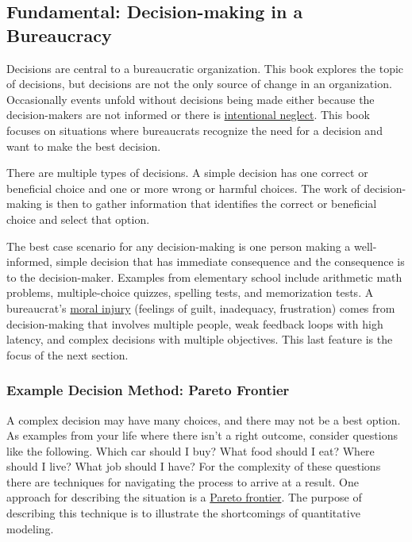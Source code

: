 \subsection*{Fundamental: Decision-making in a Bureaucracy\label{sec:decision-making}}

Decisions are central to a bureaucratic organization. This book explores the topic of decisions, but decisions are not the only source of change in an organization. Occasionally events unfold without decisions being made either because the decision-makers are not informed or there is  \href{https://en.wikipedia.org/wiki/Willful_blindness}{intentional neglect}. 
\iftoggle{WPinmargin}{\marginpar{$>$Wikipedia: Willful blindness}}{}
This book focuses on situations where bureaucrats recognize the need for a decision and want to make the best decision.

There are multiple types of decisions. 
A \gls{simple decision} \iftoggle{glossaryinmargin}{\marginpar{[Glossary]}}{}%
has one correct or beneficial choice and one or more wrong or harmful choices. The work of decision-making is then to gather information that identifies the correct or beneficial choice and select that option.

The best case scenario for any decision-making is one person making a well-informed, simple decision that has immediate consequence and the consequence is to the decision-maker. Examples from elementary school include arithmetic math problems, multiple-choice quizzes, spelling tests, and memorization tests. A bureaucrat's \href{https://en.wikipedia.org/wiki/Moral_injury}{moral injury}
\iftoggle{WPinmargin}{\marginpar{$>$Wikipedia: moral injury}}{}
(feelings of guilt, inadequacy, frustration)
comes from decision-making that involves multiple people, weak feedback loops with high latency, and complex decisions with multiple objectives. This last feature is the focus of the next section.

\subsubsection*{Example Decision Method: Pareto Frontier\label{sec:pareto}}

A complex decision may have many choices, and there may not be a best option. 
As examples from your life where there isn't a right outcome, consider questions like the following.
Which car should I buy? What food should I eat? Where should I live? What job should I have? 
For the complexity of these questions there are techniques for navigating the process to arrive at a result. 
One approach for describing the situation is a \href{https://en.wikipedia.org/wiki/Pareto_front}{Pareto frontier}. The purpose of describing this technique is to illustrate the shortcomings of quantitative modeling. 

